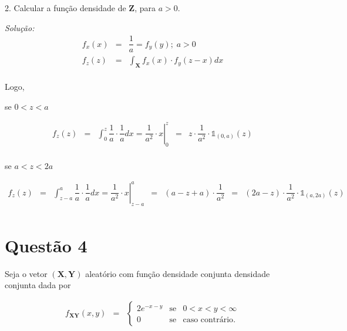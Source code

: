 \documentclass[a4paper, 11pt]{article}
\begin{document}
2. Calcular a função densidade de $\mathbf{Z}$, para $a>0$.

\noindent
\textit{Solução:} \\
\begin{equation*}
\begin{array}{lclll}
f_{x}(x) & = & \dfrac{1}{a} = f_{y}(y); \; a>0 \\

f_{z}(z) & = & \displaystyle\int_{\mathbf{X}} f_{x}(x) \cdot f_{y}(z-x)dx  \\[25pt]
\end{array}
\end{equation*}

Logo, 

\hspace{1cm} se $0<z<a$

\begin{equation*}
\begin{array}{lclll}
f_{z}(z) & = & \left.\displaystyle\int_{0}^{z} \dfrac{1}{a} \cdot \dfrac{1}{a} dx = \dfrac{1}{a^2}\cdot x \right\vert_{0}^{z} & = & z \cdot \dfrac{1}{a^2} \cdot \mathds{1}_{(0,a)}(z) \\[25pt]
\end{array}
\end{equation*}

\hspace{1cm} se $a<z<2a$

\begin{equation*}
\begin{array}{lcllllll}
f_{z}(z) & = & \left.\displaystyle\int_{z-a}^{a} \dfrac{1}{a} \cdot \dfrac{1}{a} dx = \dfrac{1}{a^2}\cdot x \right\vert_{z-a}^{a} & = & (a - z + a) \cdot \dfrac{1}{a^2} & = & (2a - z) \cdot \dfrac{1}{a^2} \cdot \mathds{1}_{(a,2a)}(z) \\[25pt]
\end{array}
\end{equation*}

\section*{Questão 4}

Seja o vetor $(\mathbf{X},\mathbf{Y})$ aleatório com função densidade conjunta densidade conjunta dada por 

\begin{equation*}
\begin{array}{lcllllll}
f_{\mathbf{X}\mathbf{Y}}(x,y) & = & \left\{
    \begin{array}{rccc}
         2 e^{-x-y} & \mbox{se} & 0<x<y<\infty\\
         0 & \mbox{se} & \mbox{caso contrário}.
    \end{array}
\right. \\
\end{array}
\end{equation*}
\end{document}
